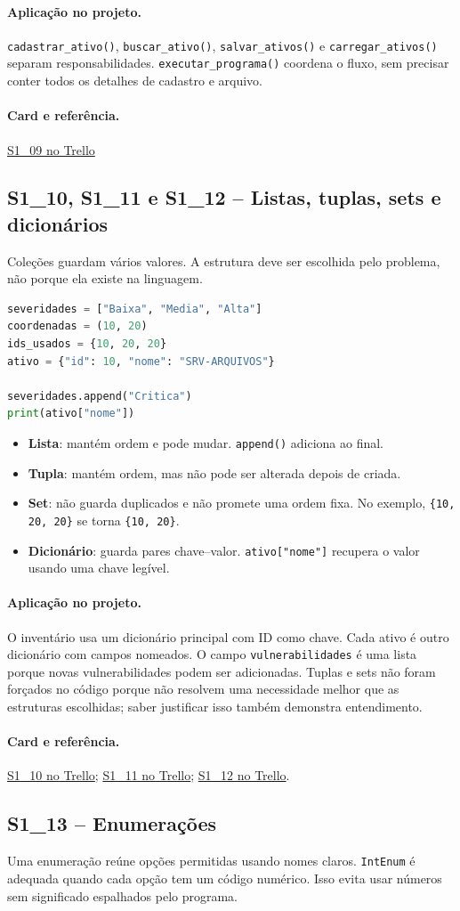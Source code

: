\documentclass[11pt,a4paper]{article}
\newcommand{\projeto}{\paragraph{Aplicação no projeto.}}
\newcommand{\referencia}[2]{\paragraph{Card e referência.}\href{#1}{#2}}
\newcommand{\cardsection}[1]{\Needspace{12\baselineskip}\subsection{#1}}
\begin{document}
\projeto
\texttt{cadastrar\_ativo()}, \texttt{buscar\_ativo()}, \texttt{salvar\_ativos()} e \texttt{carregar\_ativos()} separam responsabilidades. \texttt{executar\_programa()} coordena o fluxo, sem precisar conter todos os detalhes de cadastro e arquivo.

\referencia{https://trello.com/c/XWD40Pgo}{S1\_09 no Trello}

\cardsection{S1\_10, S1\_11 e S1\_12 -- Listas, tuplas, sets e dicionários}

Coleções guardam vários valores. A estrutura deve ser escolhida pelo problema, não porque ela existe na linguagem.

\begin{lstlisting}[language=Python,caption={Comparação entre coleções}]
severidades = ["Baixa", "Media", "Alta"]
coordenadas = (10, 20)
ids_usados = {10, 20, 20}
ativo = {"id": 10, "nome": "SRV-ARQUIVOS"}

severidades.append("Critica")
print(ativo["nome"])
\end{lstlisting}

\begin{itemize}
  \item \textbf{Lista}: mantém ordem e pode mudar. \texttt{append()} adiciona ao final.
  \item \textbf{Tupla}: mantém ordem, mas não pode ser alterada depois de criada.
  \item \textbf{Set}: não guarda duplicados e não promete uma ordem fixa. No exemplo, \texttt{\{10, 20, 20\}} se torna \texttt{\{10, 20\}}.
  \item \textbf{Dicionário}: guarda pares chave--valor. \texttt{ativo["nome"]} recupera o valor usando uma chave legível.
\end{itemize}

\projeto
O inventário usa um dicionário principal com ID como chave. Cada ativo é outro dicionário com campos nomeados. O campo \texttt{vulnerabilidades} é uma lista porque novas vulnerabilidades podem ser adicionadas. Tuplas e sets não foram forçados no código porque não resolvem uma necessidade melhor que as estruturas escolhidas; saber justificar isso também demonstra entendimento.

\referencia{https://trello.com/c/EurwtLl9}{S1\_10 no Trello}; \href{https://trello.com/c/qEvT77g5}{S1\_11 no Trello}; \href{https://trello.com/c/N1J9NE4k}{S1\_12 no Trello}.

\cardsection{S1\_13 -- Enumerações}

Uma enumeração reúne opções permitidas usando nomes claros. \texttt{IntEnum} é adequada quando cada opção tem um código numérico. Isso evita usar números sem significado espalhados pelo programa.
\end{document}
